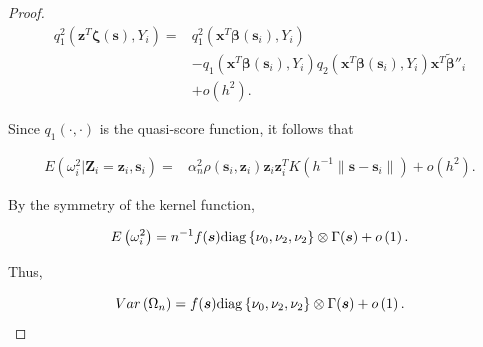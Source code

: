 \documentclass[authoryear,review, 12pt]{elsarticle}
\begin{document}
\begin{proof}
\begin{align*}
q_{1}^{2}\left(\bm{z}^{T}\bm{\zeta}(\bm{s}),Y_{i}\right)= & q_{1}^{2}\left(\bm{x}^{T}\bm{\beta}(\bm{s}_{i}),Y_{i}\right)\\
 & -q_{1}\left(\bm{x}^{T}\bm{\beta}(\bm{s}_{i}),Y_{i}\right)q_{2}\left(\bm{x}^{T}\bm{\beta}(\bm{s}_{i}),Y_{i}\right)\bm{x}^{T}\tilde{\bm{\beta}}''_{i}\\
 & +o\left(h^{2}\right).
\end{align*}


Since $q_{1}\left(\cdot,\cdot\right)$ is the quasi-score function,
it follows that 

\begin{align*}
E\left(\omega_{i}^{2}|\bm{Z}_{i}=\bm{z}_{i},\bm{s}_{i}\right)= & \alpha_{n}^{2}\rho(\bm{s}_{i},\bm{z}_{i})\bm{z}_{i}\bm{z}_{i}^{T}K\left(h^{-1}\|\bm{s}-\bm{s}_{i}\|\right)+o\left(h^{2}\right).
\end{align*}


By the symmetry of the kernel function,

\[
E\left(\omega_{i}^{2}\right)=n^{-1}f(\bm{s}){\rm diag}\left\{ \nu_{0},\nu_{2},\nu_{2}\right\} \otimes\Gamma(\bm{s})+o\left(1\right).
\]


Thus, 

\[
Var\left(\Omega_{n}\right)=f(\bm{s}){\rm diag}\left\{ \nu_{0},\nu_{2},\nu_{2}\right\} \otimes\Gamma(\bm{s})+o\left(1\right).
\]

\end{proof}
\end{document}
